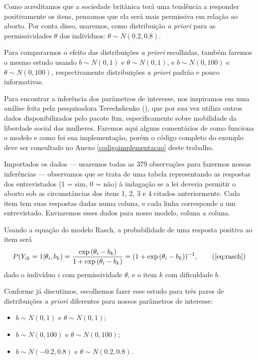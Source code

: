 \documentclass[
	12pt,				%
	openright,			%
	twoside,			%
	a4paper,			%
	english,			%
	brazil				%
	]{abntex2}
\begin{document}
 Como acreditamos que a sociedade britânica terá uma tendência a responder positivamente os itens, pensamos que ela será mais permissiva em relação ao aborto. Por conta disso, usaremos, como distribuição \emph{a priori} para as permissividades $\theta$ dos indivíduos: $\theta \sim N(0.2, 0.8)$.

 Para compararmos o efeito das distribuições \emph{a priori} escolhidas, também faremos o mesmo estudo usando $b \sim N(0, 1)$ e $\theta \sim N(0, 1)$, e $b \sim N(0, 100)$ e $\theta \sim N(0, 100)$, respectivamente distribuições \emph{a priori} padrão e pouco informativas.
 
 Para encontrar a inferência dos parâmetros de interesse, nos inspiramos em uma análise feita pela pesquisadora Terechshenko (\citeyear{terechshenko2017}), que por sua vez utiliza outros dados disponibilizados pelo pacote ltm, especificamente sobre mobilidade da liberdade social das mulheres. Faremos aqui alguns comentários de como funciona o modelo e como foi sua implementação, porém o código completo do exemplo deve ser consultado no Anexo \ref{codigoimplementacao} deste trabalho.

 Importados os dados --- usaremos todas as 379 observações para fazermos nossas inferências --- observamos que se trata de uma tabela representando as respostas dos entrevistados (1 = sim, 0 = não) à indagação se a lei deveria permitir o aborto sob as circunstâncias dos itens 1, 2, 3 e 4 citados anteriormente. Cada item tem suas respostas dadas numa coluna, e cada linha corresponde a um entrevistado. Enviaremos esses dados para nosso modelo, coluna a coluna.

 Usando a equação do modelo Rasch, a probabilidade de uma resposta positiva ao item será
 \begin{equation}
    P(Y_{ik} = 1| \theta_{i}, b_{k}) = \frac{\exp{(\theta_{i} - b_{k})}}{1+\exp{(\theta_{i} - b_{k})}} = (1 + \exp{(\theta_{i} - b_{k})})^{-1},\tag{\ref{eq:rasch}}
  \end{equation}
 dado o indivíduo $i$ com permissividade $\theta$, e o item $k$ com dificuldade $b$.
 
 Conforme já discutimos, escolhemos fazer esse estudo para três pares de distribuições \emph{a priori} diferentes para nossos parâmetros de interesse:
 \begin{itemize}
  \item $b \sim N(0, 1)$ e $\theta \sim N(0, 1)$;
  \item $b \sim N(0, 100)$ e $\theta \sim N(0, 100)$;
  \item $b \sim N(-0.2, 0.8)$ e $\theta \sim N(0.2, 0.8)$.
 \end{itemize}
\end{document}
